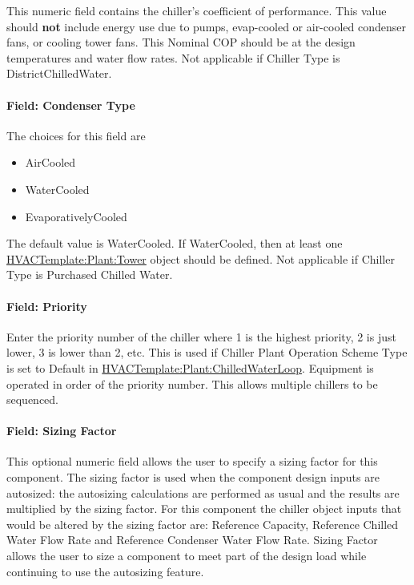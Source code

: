 This numeric field contains the chiller's coefficient of performance. This value should \textbf{not} include energy use due to pumps, evap-cooled or air-cooled condenser fans, or cooling tower fans. This Nominal COP should be at the design temperatures and water flow rates. Not applicable if Chiller Type is DistrictChilledWater.

\paragraph{Field: Condenser Type}\label{field-condenser-type-1-000}

The choices for this field are

\begin{itemize}
\item
  AirCooled
\item
  WaterCooled
\item
  EvaporativelyCooled
\end{itemize}

The default value is WaterCooled. If WaterCooled, then at least one \hyperref[hvactemplateplanttower]{HVACTemplate:Plant:Tower} object should be defined. Not applicable if Chiller Type is Purchased Chilled Water.

\paragraph{Field: Priority}\label{field-priority}

Enter the priority number of the chiller where 1 is the highest priority, 2 is just lower, 3 is lower than 2, etc. This is used if Chiller Plant Operation Scheme Type is set to Default in \hyperref[hvactemplateplantchilledwaterloop]{HVACTemplate:Plant:ChilledWaterLoop}. Equipment is operated in order of the priority number. This allows multiple chillers to be sequenced.

\paragraph{Field: Sizing Factor}\label{field-sizing-factor-000}

This optional numeric field allows the user to specify a sizing factor for this component. The sizing factor is used when the component design inputs are autosized: the autosizing calculations are performed as usual and the results are multiplied by the sizing factor. For this component the chiller object inputs that would be altered by the sizing factor are: Reference Capacity, Reference Chilled Water Flow Rate and Reference Condenser Water Flow Rate. Sizing Factor allows the user to size a component to meet part of the design load while continuing to use the autosizing feature.

